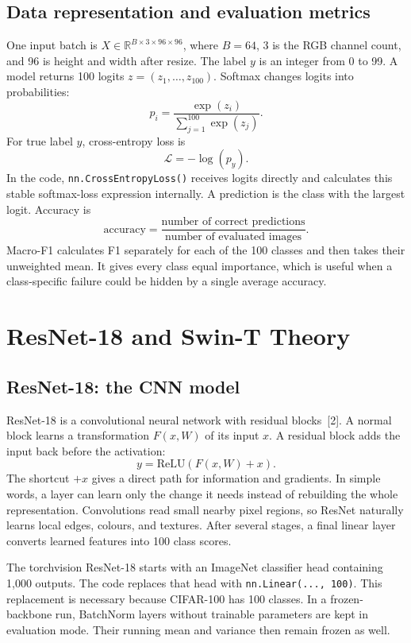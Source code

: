 \documentclass[oneside]{hcmut-report}
\begin{document}
\subsection{Data representation and evaluation metrics}
One input batch is $X\in\mathbb{R}^{B\times3\times96\times96}$, where $B=64$, 3 is the RGB channel count, and 96 is height and width after resize. The label $y$ is an integer from 0 to 99. A model returns 100 logits $z=(z_1,\ldots,z_{100})$. Softmax changes logits into probabilities:
\[
p_i=\frac{\exp(z_i)}{\sum_{j=1}^{100}\exp(z_j)}.
\]
For true label $y$, cross-entropy loss is
\[
\mathcal{L}=-\log(p_y).
\]
In the code, \texttt{nn.CrossEntropyLoss()} receives logits directly and calculates this stable softmax-loss expression internally. A prediction is the class with the largest logit. Accuracy is
\[
\mathrm{accuracy}=\frac{\text{number of correct predictions}}{\text{number of evaluated images}}.
\]
Macro-F1 calculates F1 separately for each of the 100 classes and then takes their unweighted mean. It gives every class equal importance, which is useful when a class-specific failure could be hidden by a single average accuracy.

\clearpage
\section{ResNet-18 and Swin-T Theory}
\subsection{ResNet-18: the CNN model}
ResNet-18 is a convolutional neural network with residual blocks~[2]. A normal block learns a transformation $F(x,W)$ of its input $x$. A residual block adds the input back before the activation:
\[
y=\mathrm{ReLU}(F(x,W)+x).
\]
The shortcut $+x$ gives a direct path for information and gradients. In simple words, a layer can learn only the change it needs instead of rebuilding the whole representation. Convolutions read small nearby pixel regions, so ResNet naturally learns local edges, colours, and textures. After several stages, a final linear layer converts learned features into 100 class scores.

The torchvision ResNet-18 starts with an ImageNet classifier head containing 1,000 outputs. The code replaces that head with \texttt{nn.Linear(..., 100)}. This replacement is necessary because CIFAR-100 has 100 classes. In a frozen-backbone run, BatchNorm layers without trainable parameters are kept in evaluation mode. Their running mean and variance then remain frozen as well.
\end{document}
